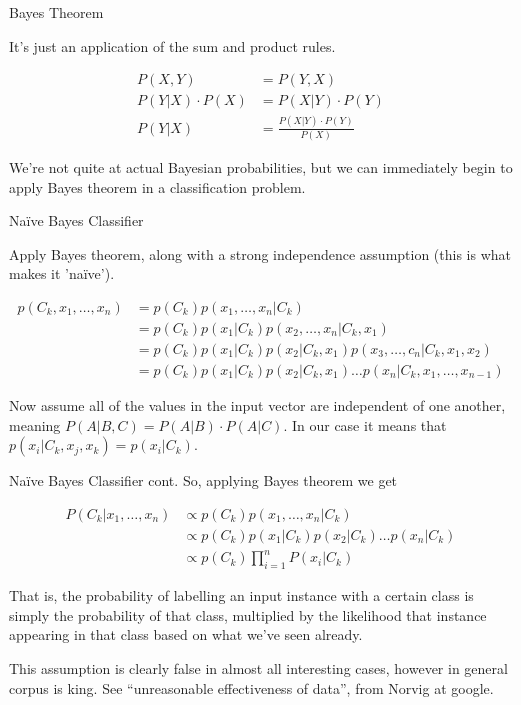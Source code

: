 \documentclass{beamer}
\begin{document}
\begin{frame}{Bayes Theorem}

  It's just an application of the sum and product rules.


  \begin{align}
    P(X, Y) &= P(Y, X) \nonumber \\
    P(Y|X) \cdot P(X) &= P(X|Y) \cdot P(Y) \nonumber \\
    P(Y|X) &= \frac{P(X|Y) \cdot P(Y)}{P(X)} \nonumber
  \end{align}

  We're not quite at actual Bayesian probabilities, but we can
  immediately begin to apply Bayes theorem in a classification problem.

\end{frame}

\begin{frame}{Na\"ive Bayes Classifier}

  Apply Bayes theorem, along with a strong independence assumption
  (this is what makes it 'na\"ive').

  \begin{align}
    p(C_k, x_1, \ldots, x_n) &= p(C_k)p(x_1, \ldots, x_n | C_k)
    \nonumber \\
    &= p(C_k)p(x_1|C_k)p(x_2, \ldots, x_n | C_k, x_1) \nonumber \\
    &= p(C_k)p(x_1|C_k)p(x_2|C_k, x_1)p(x_3,\ldots,c_n|C_k,x_1,x_2)
    \nonumber \\
    &= p(C_k)p(x_1|C_k)p(x_2|C_k,x_1)\ldots p(x_n|C_k,x_1,\ldots,
    x_{n-1}) \nonumber
  \end{align}

  Now assume all of the values in the input vector are independent of
  one another, meaning $P(A|B, C) = P(A|B) \cdot P(A|C)$. In our case
  it means that $p(x_i | C_k, x_j, x_k) = p(x_i | C_k)$.

\end{frame}

\begin{frame}{Na\"ive Bayes Classifier cont.}
  So, applying Bayes theorem we get

  \begin{align}
  P(C_k|x_1, \ldots, x_n) &\propto p(C_k) p(x_1,\ldots,x_n | C_k)
  \nonumber \\
  &\propto p(C_k) p(x_1 | C_k) p(x_2 | C_k) \ldots p(x_n | C_k)
  \nonumber \\
  &\propto p(C_k)\prod_{i=1}^{n}P(x_i | C_k) \nonumber
  \end{align}

  That is, the probability of labelling an input instance with a
  certain class is simply the probability of that class, multiplied by
  the likelihood that instance appearing in that class based on what
  we've seen already.


  {\tiny
    This assumption is clearly false in almost all interesting
    cases, however in general corpus is king. See ``unreasonable
    effectiveness of data'', from Norvig at google.
  }

\end{frame}
\end{document}

